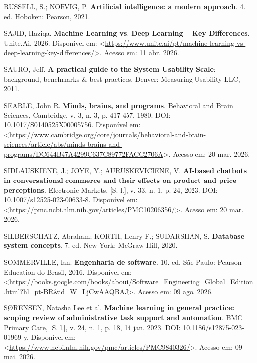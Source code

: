 \documentclass[12pt,a4paper]{extarticle}
\begin{document}
\vspace{0.5cm}\noindent
RUSSELL, S.; NORVIG, P. \textbf{Artificial intelligence: a modern approach}. 4. ed. Hoboken: Pearson, 2021.

\vspace{0.5cm}\noindent
SAJID, Haziqa. \textbf{Machine Learning vs. Deep Learning -- Key Differences}. Unite.Ai, 2026. Disponível em: <\url{https://www.unite.ai/pt/machine-learning-vs-deep-learning-key-differences/}>. Acesso em: 11 abr. 2026.

\vspace{0.5cm}\noindent
SAURO, Jeff. \textbf{A practical guide to the System Usability Scale}: background, benchmarks \& best practices. Denver: Measuring Usability LLC, 2011.

\vspace{0.5cm}\noindent
SEARLE, John R. \textbf{Minds, brains, and programs}. Behavioral and Brain Sciences, Cambridge, v. 3, n. 3, p. 417-457, 1980. DOI: 10.1017/S0140525X00005756. Disponível em: <\url{https://www.cambridge.org/core/journals/behavioral-and-brain-sciences/article/abs/minds-brains-and-programs/DC644B47A4299C637C89772FACC2706A}>. Acesso em: 20 mar. 2026.

\vspace{0.5cm}\noindent
SIDLAUSKIENE, J.; JOYE, Y.; AURUSKEVICIENE, V. \textbf{AI-based chatbots in conversational commerce and their effects on product and price perceptions}. Electronic Markets, [S. l.], v. 33, n. 1, p. 24, 2023. DOI: 10.1007/s12525-023-00633-8. Disponível em: <\url{https://pmc.ncbi.nlm.nih.gov/articles/PMC10206356/}>. Acesso em: 20 mar. 2026.

\vspace{0.5cm}\noindent
SILBERSCHATZ, Abraham; KORTH, Henry F.; SUDARSHAN, S. \textbf{Database system concepts}. 7. ed. New York: McGraw-Hill, 2020.

\vspace{0.5cm}\noindent
SOMMERVILLE, Ian. \textbf{Engenharia de software}. 10. ed. São Paulo: Pearson Education do Brasil, 2016. Disponível em: <\url{https://books.google.com/books/about/Software_Engineering_Global_Edition.html?hl=pt-BR&id=W_LjCwAAQBAJ}>. Acesso em: 09 ago. 2026.

\vspace{0.5cm}\noindent
SØRENSEN, Natasha Lee et al. \textbf{Machine learning in general practice: scoping review of administrative task support and automation}. BMC Primary Care, [S. l.], v. 24, n. 1, p. 18, 14 jan. 2023. DOI: 10.1186/s12875-023-01969-y. Disponível em: <\url{https://www.ncbi.nlm.nih.gov/pmc/articles/PMC9840326/}>. Acesso em: 09 mai. 2026.
\end{document}
